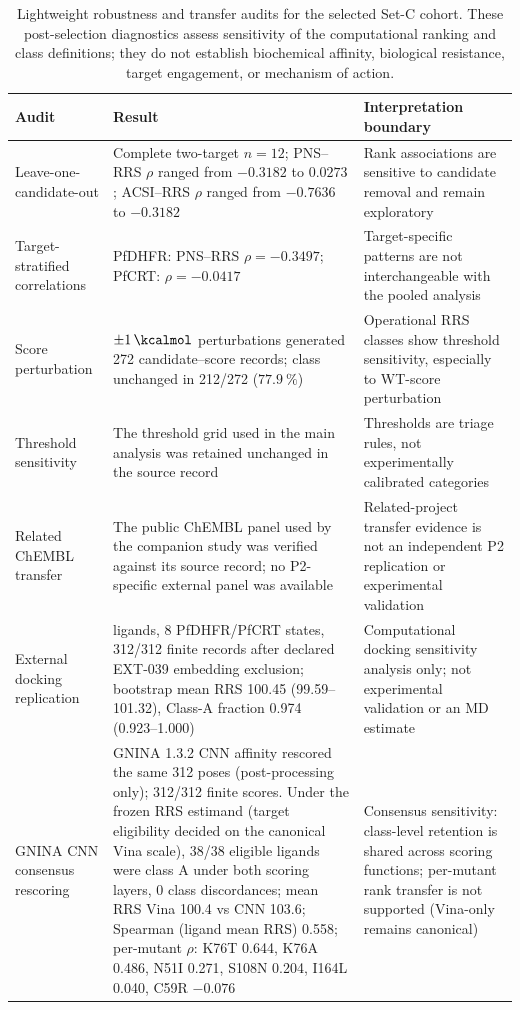 \begin{table}[htbp]
\centering
\scriptsize
\caption{Lightweight robustness and transfer audits for the selected Set-C cohort. These post-selection diagnostics assess sensitivity of the computational ranking and class definitions; they do not establish biochemical affinity, biological resistance, target engagement, or mechanism of action.}
\label{tab:s15_robustness_transfer}
\begin{tabularx}{\textwidth}{>{\raggedright\arraybackslash}p{} >{\raggedright\arraybackslash}p{} X}
\toprule
Audit & Result & Interpretation boundary \\
\midrule
Leave-one-candidate-out & Complete two-target $n=12$; PNS--RRS $\rho$ ranged from $-0.3182$ to $0.0273$; ACSI--RRS $\rho$ ranged from $-0.7636$ to $-0.3182$ & Rank associations are sensitive to candidate removal and remain exploratory \\
Target-stratified correlations & PfDHFR: PNS--RRS $\rho=-0.3497$; PfCRT: $\rho=-0.0417$ & Target-specific patterns are not interchangeable with the pooled analysis \\
Score perturbation & $\pm\qty{1}{\kcalmol}$ perturbations generated 272 candidate--score records; class unchanged in 212/272 ($\qty{77.9}{\percent}$) & Operational RRS classes show threshold sensitivity, especially to WT-score perturbation \\
Threshold sensitivity & The threshold grid used in the main analysis was retained unchanged in the source record & Thresholds are triage rules, not experimentally calibrated categories \\
Related ChEMBL transfer & The public ChEMBL panel used by the companion study was verified against its source record; no P2-specific external panel was available & Related-project transfer evidence is not an independent P2 replication or experimental validation \\
External docking replication & 39 ligands, 8 PfDHFR/PfCRT states, 312/312 finite records after declared EXT-039 embedding exclusion; bootstrap mean RRS \num{100.45} (\numrange{99.59}{101.32}), Class-A fraction \num{0.974} (\numrange{0.923}{1.000}) & Computational docking sensitivity analysis only; not experimental validation or an MD estimate \\
GNINA CNN consensus rescoring & GNINA 1.3.2 CNN affinity rescored the same 312 poses (post-processing only); 312/312 finite scores. Under the frozen RRS estimand (target eligibility decided on the canonical Vina scale), 38/38 eligible ligands were class A under both scoring layers, 0 class discordances; mean RRS Vina \num{100.4} vs CNN \num{103.6}; Spearman (ligand mean RRS) \num{0.558}; per-mutant $\rho$: K76T \num{0.644}, K76A \num{0.486}, N51I \num{0.271}, S108N \num{0.204}, I164L \num{0.040}, C59R $-0.076$ & Consensus sensitivity: class-level retention is shared across scoring functions; per-mutant rank transfer is not supported (Vina-only remains canonical) \\

\end{tabularx}
\end{table}
